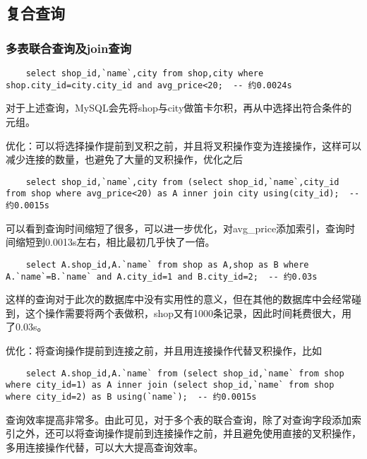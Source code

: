 \documentclass[a4paper, 11pt, nofonts, nocap, fancyhdr]{ctexart}
\begin{document}
\subsection{复合查询}

\subsubsection{多表联合查询及join查询}

	\begin{lstlisting}
	select shop_id,`name`,city from shop,city where shop.city_id=city.city_id and avg_price<20;  -- 约0.0024s
	\end{lstlisting}

对于上述查询，MySQL会先将shop与city做笛卡尔积，再从中选择出符合条件的元组。

优化：可以将选择操作提前到叉积之前，并且将叉积操作变为连接操作，这样可以减少连接的数量，也避免了大量的叉积操作，优化之后

	\begin{lstlisting}
	select shop_id,`name`,city from (select shop_id,`name`,city_id from shop where avg_price<20) as A inner join city using(city_id);  -- 约0.0015s
	\end{lstlisting}

可以看到查询时间缩短了很多，可以进一步优化，对avg_price添加索引，查询时间缩短到0.0013s左右，相比最初几乎快了一倍。

	\begin{lstlisting}
	select A.shop_id,A.`name` from shop as A,shop as B where A.`name`=B.`name` and A.city_id=1 and B.city_id=2;  -- 约0.03s
	\end{lstlisting}

这样的查询对于此次的数据库中没有实用性的意义，但在其他的数据库中会经常碰到，这个操作需要将两个表做积，shop又有1000条记录，因此时间耗费很大，用了0.03s。

优化：将查询操作提前到连接之前，并且用连接操作代替叉积操作，比如

	\begin{lstlisting}
	select A.shop_id,A.`name` from (select shop_id,`name` from shop where city_id=1) as A inner join (select shop_id,`name` from shop where city_id=2) as B using(`name`);  -- 约0.0015s
	\end{lstlisting}

查询效率提高非常多。由此可见，对于多个表的联合查询，除了对查询字段添加索引之外，还可以将查询操作提前到连接操作之前，并且避免使用直接的叉积操作，多用连接操作代替，可以大大提高查询效率。
\end{document}

